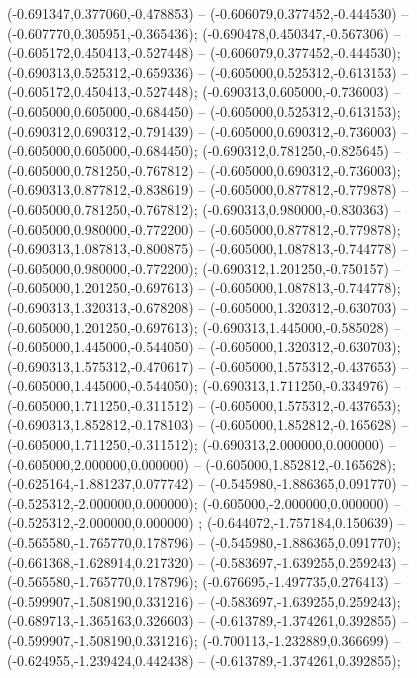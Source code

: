  (-0.691347,0.377060,-0.478853) -- (-0.606079,0.377452,-0.444530) -- (-0.607770,0.305951,-0.365436);
 (-0.690478,0.450347,-0.567306) -- (-0.605172,0.450413,-0.527448) -- (-0.606079,0.377452,-0.444530);
 (-0.690313,0.525312,-0.659336) -- (-0.605000,0.525312,-0.613153) -- (-0.605172,0.450413,-0.527448);
 (-0.690313,0.605000,-0.736003) -- (-0.605000,0.605000,-0.684450) -- (-0.605000,0.525312,-0.613153);
 (-0.690312,0.690312,-0.791439) -- (-0.605000,0.690312,-0.736003) -- (-0.605000,0.605000,-0.684450);
 (-0.690312,0.781250,-0.825645) -- (-0.605000,0.781250,-0.767812) -- (-0.605000,0.690312,-0.736003);
 (-0.690313,0.877812,-0.838619) -- (-0.605000,0.877812,-0.779878) -- (-0.605000,0.781250,-0.767812);
 (-0.690313,0.980000,-0.830363) -- (-0.605000,0.980000,-0.772200) -- (-0.605000,0.877812,-0.779878);
 (-0.690313,1.087813,-0.800875) -- (-0.605000,1.087813,-0.744778) -- (-0.605000,0.980000,-0.772200);
 (-0.690312,1.201250,-0.750157) -- (-0.605000,1.201250,-0.697613) -- (-0.605000,1.087813,-0.744778);
 (-0.690313,1.320313,-0.678208) -- (-0.605000,1.320312,-0.630703) -- (-0.605000,1.201250,-0.697613);
 (-0.690313,1.445000,-0.585028) -- (-0.605000,1.445000,-0.544050) -- (-0.605000,1.320312,-0.630703);
 (-0.690313,1.575312,-0.470617) -- (-0.605000,1.575312,-0.437653) -- (-0.605000,1.445000,-0.544050);
 (-0.690313,1.711250,-0.334976) -- (-0.605000,1.711250,-0.311512) -- (-0.605000,1.575312,-0.437653);
 (-0.690313,1.852812,-0.178103) -- (-0.605000,1.852812,-0.165628) -- (-0.605000,1.711250,-0.311512);
 (-0.690313,2.000000,0.000000) -- (-0.605000,2.000000,0.000000) -- (-0.605000,1.852812,-0.165628);
 (-0.625164,-1.881237,0.077742) -- (-0.545980,-1.886365,0.091770) -- (-0.525312,-2.000000,0.000000);
 (-0.605000,-2.000000,0.000000) -- (-0.525312,-2.000000,0.000000) ;
 (-0.644072,-1.757184,0.150639) -- (-0.565580,-1.765770,0.178796) -- (-0.545980,-1.886365,0.091770);
 (-0.661368,-1.628914,0.217320) -- (-0.583697,-1.639255,0.259243) -- (-0.565580,-1.765770,0.178796);
 (-0.676695,-1.497735,0.276413) -- (-0.599907,-1.508190,0.331216) -- (-0.583697,-1.639255,0.259243);
 (-0.689713,-1.365163,0.326603) -- (-0.613789,-1.374261,0.392855) -- (-0.599907,-1.508190,0.331216);
 (-0.700113,-1.232889,0.366699) -- (-0.624955,-1.239424,0.442438) -- (-0.613789,-1.374261,0.392855);
